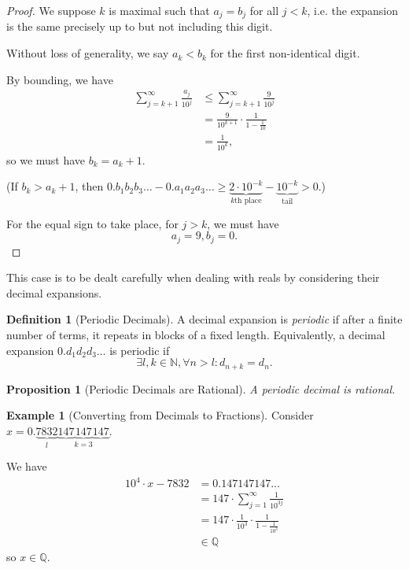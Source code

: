 \documentclass{article}
\newtheorem{proposition}[theorem]{Proposition}
\theoremstyle{definition}
\newtheorem{definition}[theorem]{Definition}
\newtheorem{example}[theorem]{Example}
\theoremstyle{remark}
\newcommand{\NN}{\mathbb{N}}
\newcommand{\QQ}{\mathbb{Q}}
\begin{document}
\begin{proof}
    We suppose \(k\) is maximal such that \(a_j = b_j\) for all \(j < k\), i.e. the expansion is the same precisely up to but not including this digit.

    Without loss of generality, we say \(a_k < b_k\) for the first non-identical digit.

    By bounding, we have
    \begin{align*}
        \sum_{j = k + 1}^{\infty} \frac{a_j}{10^j} &\leq \sum_{j = k + 1}^{\infty} \frac{9}{10^j} \\
        &= \frac{9}{10^{k + 1}} \cdot \frac{1}{1 - \frac{1}{10}} \\
        &= \frac{1}{10^k},
    \end{align*}
    so we must have \(b_k = a_k + 1\).

    (If \(b_k > a_k + 1\), then \(0.b_1 b_2 b_3 \ldots - 0.a_1 a_2 a_3 \ldots \geq \underbrace{2\cdot 10^{-k}}_{k\text{th place}} - \underbrace{10^{-k}}_{\text{tail}} > 0\).)

    For the equal sign to take place, for \(j > k\), we must have
    \[
        a_j = 9, b_j = 0.
    \]
\end{proof}

This case is to be dealt carefully when dealing with reals by considering their decimal expansions.

\begin{definition}[Periodic Decimals]
    A decimal expansion is \emph{periodic} if after a finite number of terms, it repeats in blocks of a fixed length. Equivalently, a decimal expansion \(0.d_1 d_2 d_3 \ldots\) is periodic if
    \[
        \exists l, k \in \NN, \forall n > l: d_{n + k} = d_n.
    \]
\end{definition}

\begin{proposition}[Periodic Decimals are Rational]
    A periodic decimal is rational.
\end{proposition}

\begin{example}[Converting from Decimals to Fractions]
    Consider \(x = 0.\underbrace{7832}_{l}\underbrace{147}\underbrace{147}_{k = 3}\underbrace{147}\).

    We have
    \begin{align*}
        10^4 \cdot x - 7832 &= 0.147 147 147 \ldots \\
        &= 147 \cdot \sum_{j = 1}^{\infty} \frac{1}{10^{3j}} \\
        &= 147 \cdot \frac{1}{10^3} \cdot \frac{1}{1 - \frac{1}{10^3}} \\
        &\in \QQ
    \end{align*}
    so \(x \in \QQ\).
\end{example}
\end{document}
